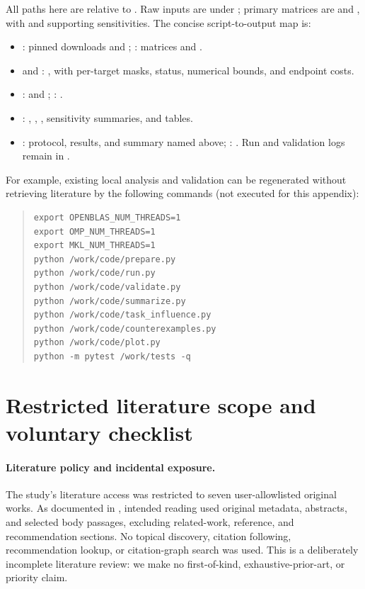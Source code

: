 All paths here are relative to . Raw inputs are under ; primary matrices are  and , with  and  supporting sensitivities. The concise script-to-output map is:
\begin{itemize}
 \setlength{\itemsep}{0pt}
 \item {}: pinned downloads and ; : matrices and .
 \item {} and : , with per-target masks, status, numerical bounds, and endpoint costs.
 \item {}:  and ; : .
 \item {}: , , , sensitivity summaries, and  tables.
 \item {}: protocol, results, and summary named above; : . Run and validation logs remain in .
\end{itemize}
For example, existing local analysis and validation can be regenerated without retrieving literature by the following commands (not executed for this appendix):
\begin{quote}\small
\begin{verbatim}
export OPENBLAS_NUM_THREADS=1
export OMP_NUM_THREADS=1
export MKL_NUM_THREADS=1
python /work/code/prepare.py
python /work/code/run.py
python /work/code/validate.py
python /work/code/summarize.py
python /work/code/task_influence.py
python /work/code/counterexamples.py
python /work/code/plot.py
python -m pytest /work/tests -q
\end{verbatim}
\end{quote}

\section{Restricted literature scope and voluntary checklist}
\label{app:checklist}

\paragraph{Literature policy and incidental exposure.}\label{app:restriction}
The study's literature access was restricted to seven user-allowlisted original works. As documented in , intended reading used original metadata, abstracts, and selected body passages, excluding related-work, reference, and recommendation sections. No topical discovery, citation following, recommendation lookup, or citation-graph search was used. This is a deliberately incomplete literature review: we make no first-of-kind, exhaustive-prior-art, or priority claim.

